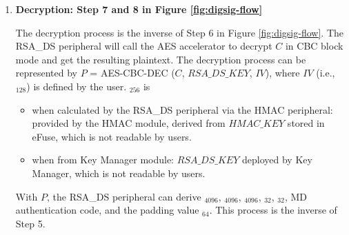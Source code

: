 \documentclass[main\_\_EN.tex]{subfiles}
\begin{document}
\begin{enumerate}

    \item {\bfseries Decryption: Step 7 and 8 in Figure \ref{fig:digsig-flow}}


        The decryption process is the inverse of Step 6 in Figure \ref{fig:digsig-flow}. The RSA\_DS peripheral will call the AES accelerator to decrypt \begin{math}C\end{math} in CBC block mode and get the resulting plaintext. The decryption process can be represented by \begin{math}P\end{math} = AES-CBC-DEC (\begin{math}C\end{math}, \begin{math}RSA\_DS\_KEY\end{math}, \begin{math}IV\end{math}), where \begin{math}IV\end{math} (i.e., \begin{math}[IV]_{128}\end{math}) is defined by the user. \begin{math}[RSA\_DS\_KEY]_{256}\end{math} is
        \begin{itemize}
            \item when calculated by the RSA\_DS peripheral via the HMAC peripheral: provided by the HMAC module, derived from \begin{math}HMAC\_KEY\end{math} stored in eFuse, which is not readable by users.
            \item when from Key Manager module:  \begin{math}RSA\_DS\_KEY\end{math} deployed by Key Manager, which is not readable by users.
        \end{itemize}

        With \begin{math}P\end{math}, the RSA\_DS peripheral can derive \begin{math}[Y]_{4096}\end{math}, \begin{math}[M]_{4096}\end{math}, \begin{math}[\overline{r}]_{4096}\end{math}, \begin{math}[M^{\prime}]_{32}\end{math}, \begin{math}[L]_{32}\end{math}, MD authentication code, and the padding value \begin{math}[\beta]_{64} \end{math}. This process is the inverse of Step 5.


\end{enumerate}
\end{document}

